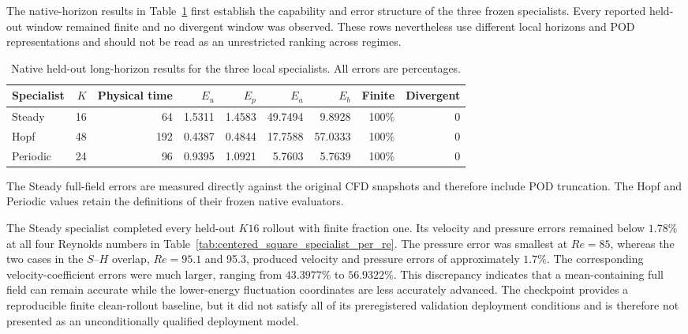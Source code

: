 The native-horizon results in
Table~\ref{tab:centered_square_specialist_aggregate} first establish the
capability and error structure of the three frozen specialists.  Every
reported held-out window remained finite and no divergent window was
observed.  These rows nevertheless use different local horizons and POD
representations and should not be read as an unrestricted ranking across
regimes.

\begin{table}[!htbp]
  \centering
  \caption{Native held-out long-horizon results for the three local
  specialists.  All errors are percentages.}
  \label{tab:centered_square_specialist_aggregate}
  \begin{threeparttable}
  \begin{tabular}{lrrrrrrrr}
    \toprule
    Specialist & $K$ & Physical time & $E_u$ & $E_p$ & $E_a$ & $E_b$
    & Finite & Divergent \\
    \midrule
    Steady   & 16 & 64  & 1.5311 & 1.4583 & 49.7494 & 9.8928 & 100\% & 0 \\
    Hopf     & 48 & 192 & 0.4387 & 0.4844 & 17.7588 & 57.0333 & 100\% & 0 \\
    Periodic & 24 & 96  & 0.9395 & 1.0921 & 5.7603  & 5.7639 & 100\% & 0 \\
    \bottomrule
  \end{tabular}
  \begin{tablenotes}\footnotesize
    \item The Steady full-field errors are measured directly against the
    original CFD snapshots and therefore include POD truncation.  The Hopf
    and Periodic values retain the definitions of their frozen native
    evaluators.
  \end{tablenotes}
  \end{threeparttable}
\end{table}

The Steady specialist completed every held-out $K16$ rollout with finite
fraction one.  Its velocity and pressure errors remained below $1.78\%$ at
all four Reynolds numbers in
Table~\ref{tab:centered_square_specialist_per_re}.  The pressure error was
smallest at $Re=85$, whereas the two cases in the $S$--$H$ overlap,
$Re=95.1$ and 95.3, produced velocity and pressure errors of approximately
$1.7\%$.  The corresponding velocity-coefficient errors were much larger,
ranging from $43.3977\%$ to $56.9322\%$.  This discrepancy indicates that a
mean-containing full field can remain accurate while the lower-energy
fluctuation coordinates are less accurately advanced.  The checkpoint
provides a reproducible finite clean-rollout baseline, but it did not satisfy
all of its preregistered validation deployment conditions and is therefore
not presented as an unconditionally qualified deployment model.

